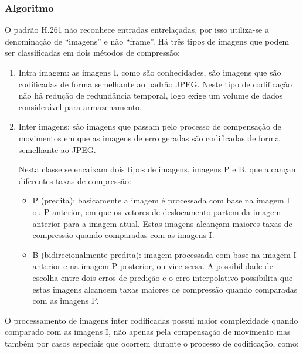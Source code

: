 \subsubsection{Algoritmo}
\label{mpeg:algoritmo}

O padrão H.261 não reconhece entradas entrelaçadas, por isso utiliza-se a denominação de ``imagens'' e não ``frame''. Há três tipos de imagens que podem ser classificadas em dois métodos de compressão:

\begin{enumerate}
\item Intra imagem: as imagens I, como são conhecidades, são imagens que são codificadas de forma semelhante ao padrão JPEG. Neste tipo de codificação não há redução de redundância temporal, logo exige um volume de dados considerável para armazenamento.

\item Inter imagens: são imagens que passam pelo processo de compensação de movimentos em que as imagens de erro geradas são codificadas de forma semelhante ao JPEG.

Nesta classe se encaixam dois tipos de imagens, imagens P e B, que alcançam diferentes taxas de compressão:

\begin{itemize}
\item P (predita): basicamente a imagem é processada com base na imagem I ou P anterior, em que os vetores de deslocamento partem da imagem anterior para a imagem atual. Estas imagens alcançam maiores taxas de compressão quando comparadas com as imagens I.

\item B (bidirecionalmente predita): imagem processada com base na imagem I anterior e na imagem P posterior, ou vice sersa. A possibilidade de escolha entre dois erros de predição e o erro interpolativo possibilita que estas imagens alcancem taxas maiores de compressão quando comparadas com as imagens P.
\end{itemize}

\end{enumerate}

O processamento de imagens inter codificadas possui maior complexidade quando comparado com as imagens I, não apenas pela compensação de movimento mas também por casos especiais que ocorrem durante o processo de codificação, como:

